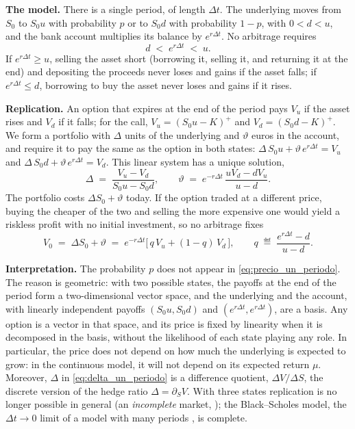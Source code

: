 \medskip

\noindent\textbf{The model.}
There is a single period, of length $\Delta t$. The underlying moves
from $S_0$ to $S_0 u$ with probability $p$ or to $S_0 d$ with
probability $1 - p$, with $0 < d < u$, and the bank account multiplies
its balance by $e^{r\Delta t}$. No arbitrage requires
\begin{equation}\label{eq:no_arbitraje_un_periodo}
  d \;<\; e^{r\Delta t} \;<\; u .
\end{equation}
If $e^{r\Delta t} \geq u$, selling the asset short (borrowing it,
selling it, and returning it at the end) and depositing the proceeds never loses
and gains if the asset falls; if $e^{r\Delta t} \leq d$, borrowing to
buy the asset never loses and gains if it rises.

\medskip

\noindent\textbf{Replication.}
An option that expires at the end of the period pays $V_u$ if the asset
rises and $V_d$ if it falls; for the call, $V_u = (S_0 u - K)^+$ and
$V_d = (S_0 d - K)^+$. We form a portfolio with $\Delta$ units of the
underlying and $\vartheta$ euros in the account, and require it to pay
the same as the option in both states:
$\Delta\, S_0 u + \vartheta\, e^{r\Delta t} = V_u$ and
$\Delta\, S_0 d + \vartheta\, e^{r\Delta t} = V_d$. This linear system
has a unique solution,
\begin{equation}\label{eq:delta_un_periodo}
  \Delta \;=\; \frac{V_u - V_d}{S_0 u - S_0 d},
  \qquad
  \vartheta \;=\; e^{-r\Delta t}\,\frac{u V_d - d V_u}{u - d}.
\end{equation}
The portfolio costs $\Delta S_0 + \vartheta$ today. If the option traded
at a different price, buying the cheaper of the two and selling the
more expensive one would yield a riskless profit with no initial
investment, so no arbitrage fixes
\begin{equation}\label{eq:precio_un_periodo}
  V_0 \;=\; \Delta S_0 + \vartheta
  \;=\; e^{-r\Delta t}\bigl[\,q\, V_u + (1 - q)\, V_d\,\bigr],
  \qquad
  q \;\eqdef\; \frac{e^{r\Delta t} - d}{u - d}.
\end{equation}

\noindent\textbf{Interpretation.}
The probability $p$ does not appear in \eqref{eq:precio_un_periodo}.
The reason is geometric: with two possible states, the payoffs at the
end of the period form a two-dimensional vector space, and the
underlying and the account, with linearly independent payoffs
$(S_0 u, S_0 d)$ and $(e^{r\Delta t}, e^{r\Delta t})$, are a basis. Any
option is a vector in that space, and its price is fixed by linearity
when it is decomposed in the basis, without the likelihood of each
state playing any role. In particular, the price does not depend on how
much the underlying is expected to grow: in the continuous model, it
will not depend on its expected return $\mu$. Moreover, $\Delta$ in
\eqref{eq:delta_un_periodo} is a difference quotient,
$\Delta V / \Delta S$, the discrete version of the hedge
ratio $\Delta = \partial_S V$. With three states replication is no longer
possible in general (an \emph{incomplete} market,
\cite[Section~2.2.5]{tfgm}); the Black--Scholes model, the
$\Delta t \to 0$ limit of a model with many periods
\cite[Sections~2.3--2.4]{tfgm}, is complete.

